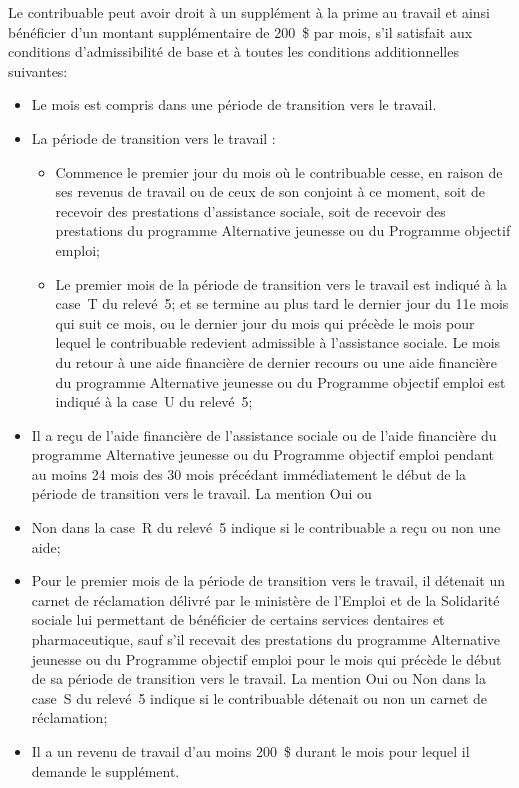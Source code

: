 Le contribuable peut avoir droit à un supplément à la prime au travail et ainsi bénéficier d'un montant supplémentaire de 200~\$ par mois, s'il satisfait aux conditions d'admissibilité de base et à toutes les conditions additionnelles suivantes:
\begin{itemize}
	\item Le mois est compris dans une période de transition vers le travail.
	\item La \og période de transition vers le travail \fg{}:
	\begin{itemize}
		\item Commence le premier jour du mois où le contribuable cesse, en raison de ses revenus de travail ou de ceux de son conjoint à ce moment, soit de recevoir des prestations d'assistance sociale, soit de recevoir des prestations du programme Alternative jeunesse ou du Programme objectif emploi;
		\item Le premier mois de la période de transition vers le travail est indiqué à la case~T du relevé~5; et se termine au plus tard le dernier jour du 11e mois qui suit ce mois, ou le dernier jour du mois qui précède le mois pour lequel le contribuable redevient admissible à l'assistance sociale. Le mois du retour à une aide financière de dernier recours ou une aide financière du programme Alternative jeunesse ou du Programme objectif emploi est indiqué à la case~U du relevé~5;
	\end{itemize}
	\item Il a reçu de l'aide financière de l'assistance sociale ou de l'aide financière du programme Alternative jeunesse ou du Programme objectif emploi pendant au moins 24 mois des 30 mois précédant immédiatement le début de la période de transition vers le travail. La mention \og Oui \fg{} ou
	\item \og Non \fg{} dans la case~R du relevé~5 indique si le contribuable a reçu ou non une aide;
	\item Pour le premier mois de la période de transition vers le travail, il détenait un carnet de réclamation délivré par le ministère de l'Emploi et de la Solidarité sociale lui permettant de bénéficier de certains services dentaires et pharmaceutique, sauf s'il recevait des prestations du programme Alternative jeunesse ou du Programme objectif emploi pour le mois qui précède le début de sa période de transition vers le travail. La mention \og Oui \fg{} ou \og Non \fg{} dans la case~S du relevé~5 indique si le contribuable détenait ou non un carnet de réclamation;
	\item Il a un revenu de travail d'au moins 200~\$ durant le mois pour lequel il demande le supplément.
\end{itemize}

